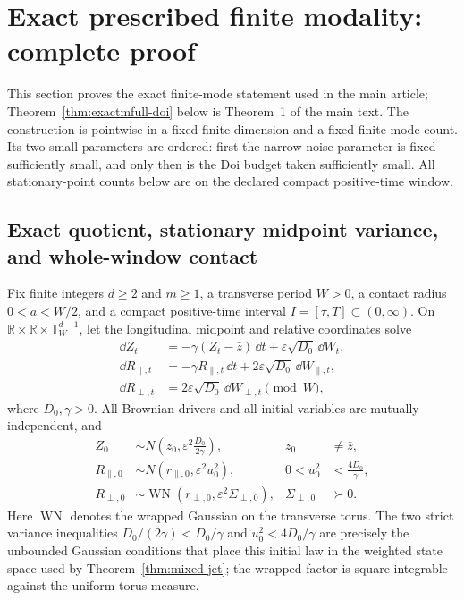 
\section{Exact prescribed finite modality: complete proof}
\label{sec:exactmfull-proof}

This section proves the exact finite-mode statement used in the main article;
Theorem~\ref{thm:exactmfull-doi} below is Theorem~1 of the main text.
The construction is pointwise in a fixed finite dimension and
a fixed finite mode count.  Its two small parameters are ordered: first the
narrow-noise parameter is fixed sufficiently small, and only then is the Doi
budget taken sufficiently small.  All stationary-point counts below are on
the declared compact positive-time window.

\subsection{Exact quotient, stationary midpoint variance, and whole-window
contact}
\label{subsec:exactmfull-physical}

Fix finite integers \(d\ge2\) and \(m\ge1\), a transverse period \(W>0\), a
contact radius \(0<a<W/2\), and a compact positive-time interval
\(I=[\tau,T]\subset(0,\infty)\).  On
\(\mathbb R\times\mathbb R\times\mathbb T_W^{d-1}\), let the longitudinal
midpoint and relative coordinates solve
\begin{align}
 \dd Z_t&=-\gamma(Z_t-\bar z)\,\dd t
       +\varepsilon\sqrt{D_0}\,\dd W_t,
 \label{eq:exactmfull-midpoint-sde}\\
 \dd R_{\parallel,t}&=-\gamma R_{\parallel,t}\,\dd t
       +2\varepsilon\sqrt{D_0}\,\dd W_{\parallel,t},
 \label{eq:exactmfull-relative-long-sde}\\
 \dd R_{\perp,t}&=2\varepsilon\sqrt{D_0}\,\dd W_{\perp,t}
       \pmod W,
 \label{eq:exactmfull-relative-perp-sde}
\end{align}
where \(D_0,\gamma>0\).  All Brownian drivers and all initial variables are
mutually independent, and
\begin{align}
 Z_0&\sim N\!\left(z_0,\varepsilon^2\frac{D_0}{2\gamma}\right),
 &z_0&\ne\bar z,
 \label{eq:exactmfull-midpoint-initial}\\
 R_{\parallel,0}&\sim
 N(r_{\parallel,0},\varepsilon^2u_0^2),
 &0<u_0^2&<\frac{4D_0}{\gamma},
 \label{eq:exactmfull-relative-long-initial}\\
 R_{\perp,0}&\sim
 \operatorname{WN}(r_{\perp,0},\varepsilon^2\Sigma_{\perp,0}),
 &\Sigma_{\perp,0}&\succ0.
 \label{eq:exactmfull-relative-perp-initial}
\end{align}
Here \(\operatorname{WN}\) denotes the wrapped Gaussian on the transverse
torus.  The two strict variance inequalities
\(D_0/(2\gamma)<D_0/\gamma\) and
\(u_0^2<4D_0/\gamma\) are precisely the unbounded Gaussian conditions that
place this initial law in the weighted state space used by
Theorem~\ref{thm:mixed-jet}; the wrapped factor is square integrable against
the uniform torus measure.

